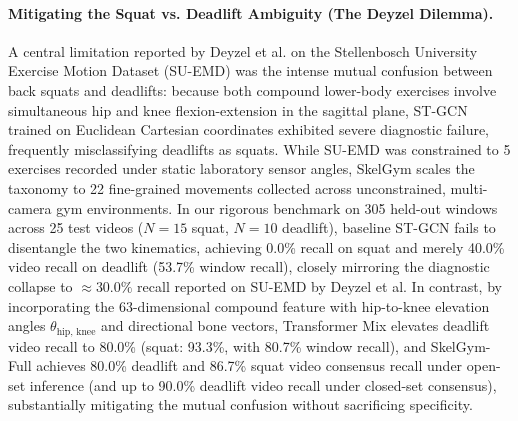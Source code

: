 \documentclass[preprint,12pt]{elsarticle}
\begin{document}
\paragraph{Mitigating the Squat vs. Deadlift Ambiguity (The Deyzel Dilemma).}
A central limitation reported by Deyzel et al. \cite{deyzel2023} on the Stellenbosch University Exercise Motion Dataset (SU-EMD) was the intense mutual confusion between back squats and deadlifts: because both compound lower-body exercises involve simultaneous hip and knee flexion-extension in the sagittal plane, ST-GCN trained on Euclidean Cartesian coordinates exhibited severe diagnostic failure, frequently misclassifying deadlifts as squats. While SU-EMD was constrained to 5 exercises recorded under static laboratory sensor angles, SkelGym scales the taxonomy to 22 fine-grained movements collected across unconstrained, multi-camera gym environments. In our rigorous benchmark on 305 held-out windows across 25 test videos ($N=15$ squat, $N=10$ deadlift), baseline ST-GCN fails to disentangle the two kinematics, achieving 0.0\% recall on squat and merely 40.0\% video recall on deadlift (53.7\% window recall), closely mirroring the diagnostic collapse to $\approx 30.0\%$ recall reported on SU-EMD by Deyzel et al. In contrast, by incorporating the 63-dimensional compound feature with hip-to-knee elevation angles $\theta_{\text{hip, knee}}$ and directional bone vectors, Transformer Mix elevates deadlift video recall to 80.0\% (squat: 93.3\%, with 80.7\% window recall), and SkelGym-Full achieves 80.0\% deadlift and 86.7\% squat video consensus recall under open-set inference (and up to 90.0\% deadlift video recall under closed-set consensus), substantially mitigating the mutual confusion without sacrificing specificity.
\end{document}
